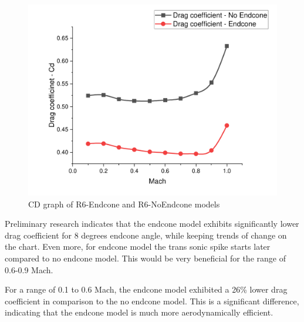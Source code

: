 \documentclass{article}
\begin{document}
\begin{figure}[H]
    \centering
    \includegraphics[width=\textwidth]{../data/DataAnalisysSolid/Solid-Studies-CD-Graph.pdf}
    \caption{CD graph of R6-Endcone and R6-NoEndcone models}
\end{figure}
Preliminary research indicates that the endcone model exhibits significantly lower drag coefficient
for 8 degrees endcone angle, while keeping trends of change on the chart. Even more, for endcone model
the trans sonic spike starts later compared to no endcone model. This would be very beneficial for the
range of 0.6-0.9 Mach.  


\begin{table}[H]
    \centering
    \caption{Average values and differences}
\end{table}
For a range of 0.1 to 0.6 Mach, the endcone model exhibited a 26\% lower drag coefficient in 
comparison to the no endcone model. This is a significant difference, indicating that the endcone
model is much more aerodynamically efficient.

\newpage
\end{document}
